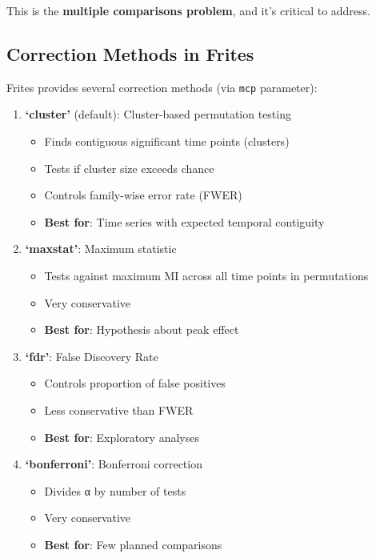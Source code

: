 \documentclass[
  11pt,
  letterpaper,
  oneside,
  openany]{book}
\providecommand{\tightlist}{%
  \setlength{\itemsep}{0pt}\setlength{\parskip}{0pt}}
\begin{document}
This is the \textbf{multiple comparisons problem}, and it's critical to
address.

\subsection{Correction Methods in
Frites}\label{correction-methods-in-frites}

Frites provides several correction methods (via \texttt{mcp} parameter):

\begin{enumerate}
\def\labelenumi{\arabic{enumi}.}
\tightlist
\item
  \textbf{`cluster'} (default): Cluster-based permutation testing

  \begin{itemize}
  \tightlist
  \item
    Finds contiguous significant time points (clusters)
  \item
    Tests if cluster size exceeds chance
  \item
    Controls family-wise error rate (FWER)
  \item
    \textbf{Best for}: Time series with expected temporal contiguity
  \end{itemize}
\item
  \textbf{`maxstat'}: Maximum statistic

  \begin{itemize}
  \tightlist
  \item
    Tests against maximum MI across all time points in permutations
  \item
    Very conservative
  \item
    \textbf{Best for}: Hypothesis about peak effect
  \end{itemize}
\item
  \textbf{`fdr'}: False Discovery Rate

  \begin{itemize}
  \tightlist
  \item
    Controls proportion of false positives
  \item
    Less conservative than FWER
  \item
    \textbf{Best for}: Exploratory analyses
  \end{itemize}
\item
  \textbf{`bonferroni'}: Bonferroni correction

  \begin{itemize}
  \tightlist
  \item
    Divides α by number of tests
  \item
    Very conservative
  \item
    \textbf{Best for}: Few planned comparisons
  \end{itemize}
\end{enumerate}
\end{document}
